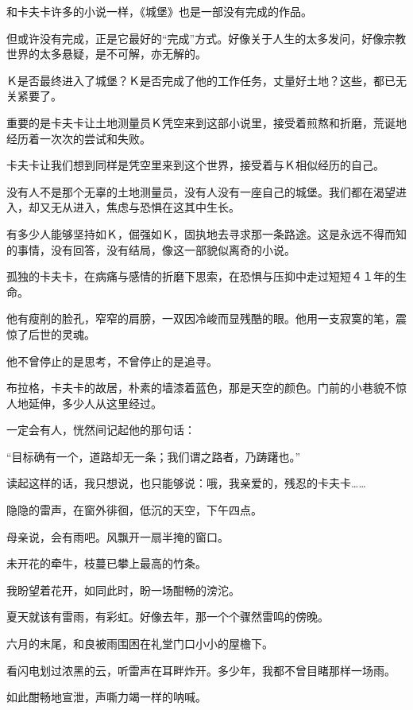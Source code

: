 \documentclass[12pt,a4paper]{article}
\begin{document}
		和卡夫卡许多的小说一样，《城堡》也是一部没有完成的作品。\par
		但或许没有完成，正是它最好的“完成”方式。好像关于人生的太多发问，好像宗教世界的太多悬疑，是不可解，亦无解的。\par
		Ｋ是否最终进入了城堡？Ｋ是否完成了他的工作任务，丈量好土地？这些，都已无关紧要了。\par
		重要的是卡夫卡让土地测量员Ｋ凭空来到这部小说里，接受着煎熬和折磨，荒诞地经历着一次次的尝试和失败。\par
		卡夫卡让我们想到同样是凭空里来到这个世界，接受着与Ｋ相似经历的自己。\par
		没有人不是那个无辜的土地测量员，没有人没有一座自己的城堡。我们都在渴望进入，却又无从进入，焦虑与恐惧在这其中生长。\par
		有多少人能够坚持如Ｋ，倔强如Ｋ，固执地去寻求那一条路途。这是永远不得而知的事情，没有回答，没有结局，像这一部貌似离奇的小说。

		孤独的卡夫卡，在病痛与感情的折磨下思索，在恐惧与压抑中走过短短４１年的生命。\par
		他有瘦削的脸孔，窄窄的肩膀，一双因冷峻而显残酷的眼。他用一支寂寞的笔，震惊了后世的灵魂。\par
		他不曾停止的是思考，不曾停止的是追寻。\par
		布拉格，卡夫卡的故居，朴素的墙漆着蓝色，那是天空的颜色。门前的小巷貌不惊人地延伸，多少人从这里经过。\par
		一定会有人，恍然间记起他的那句话：

		“目标确有一个，道路却无一条；我们谓之路者，乃踌躇也。”

		读起这样的话，我只想说，也只能够说：哦，我亲爱的，残忍的卡夫卡……

	\endwriting



		隐隐的雷声，在窗外徘徊，低沉的天空，下午四点。

		母亲说，会有雨吧。风飘开一扇半掩的窗口。

		未开花的牵牛，枝蔓已攀上最高的竹条。

		我盼望着花开，如同此时，盼一场酣畅的滂沱。

		夏天就该有雷雨，有彩虹。好像去年，那一个个骤然雷鸣的傍晚。

		六月的末尾，和良被雨围困在礼堂门口小小的屋檐下。

		看闪电划过浓黑的云，听雷声在耳畔炸开。多少年，我都不曾目睹那样一场雨。

		如此酣畅地宣泄，声嘶力竭一样的呐喊。
\end{document}
